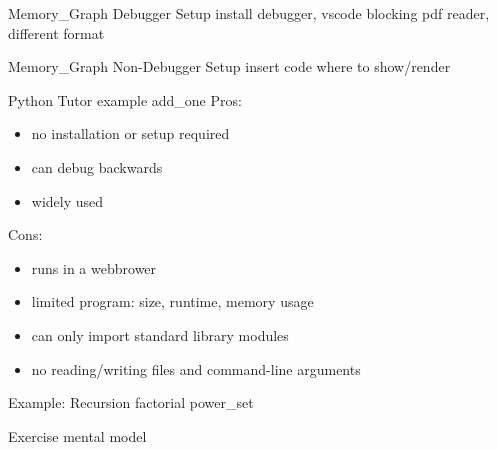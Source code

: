 \documentclass[10pt, colorlinks=true, urlcolor=blue]{beamer}
\begin{document}
\begin{frame}{Memory\_Graph Debugger Setup}
  install
  debugger, vscode
  blocking pdf reader, different format
\end{frame}

\begin{frame}{Memory\_Graph Non-Debugger Setup}
  insert code where to show/render
\end{frame}

\begin{frame}{Python Tutor}
  example add\_one
  Pros:
  \begin{itemize}
  \item no installation or setup required
  \item can debug backwards
  \item widely used
  \end{itemize}
  Cons:
  \begin{itemize}
  \item runs in a webbrower
  \item limited program: size, runtime, memory usage
  \item can only import standard library modules
  \item no reading/writing files and command-line arguments 
  \end{itemize}
  
\end{frame}

\begin{frame}{Example: Recursion}
  factorial
  power\_set
\end{frame}

\begin{frame}{Exercise}
  mental model
\end{frame}
\end{document}
